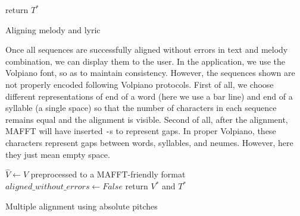 \begin{algorithm}[H]
    \BlankLine
    return $T^*$\;
    \caption{Aligning melody and lyric}
    \label{algo:volpiano_text_combine}
\end{algorithm}

Once all sequences are successfully aligned without errors in text and melody combination, we can display them to the user. In the application, we use the Volpiano font,
so as to maintain consistency. However, the sequences shown are not properly encoded following Volpiano protocols. First of all, we choose different representations of end of a word
(here we use a bar line) and end of a syllable (a single space) so that the number of characters in each sequence remains equal and the alignment is visible. Second of all,
after the alignment, MAFFT will have inserted \verb|-|s to represent gaps. In proper Volpiano, these characters represent gaps between words, syllables, and neumes. However,
here they just mean empty space.\newline

\begin{algorithm}[H]
    \BlankLine
    $\hat{V} \longleftarrow V$ preprocessed to a MAFFT-friendly format\;
    $aligned\_without\_errors \longleftarrow False$\;
    return $V^*$ and $T^*$\;
    \caption{Multiple alignment using absolute pitches}
    \label{algo:align_pitch}
\end{algorithm}


